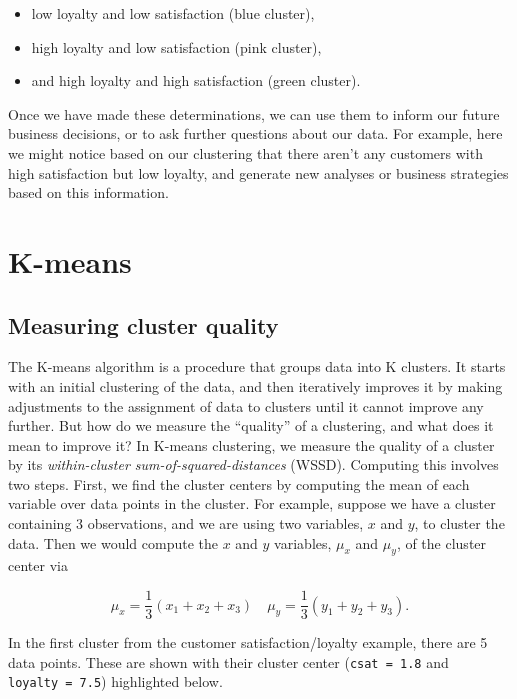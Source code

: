 \documentclass[
]{krantz}
\providecommand{\tightlist}{%
  \setlength{\itemsep}{0pt}\setlength{\parskip}{0pt}}
\begin{document}
\begin{itemize}
\tightlist
\item
  low loyalty and low satisfaction (blue cluster),
\item
  high loyalty and low satisfaction (pink cluster),
\item
  and high loyalty and high satisfaction (green cluster).
\end{itemize}

Once we have made these determinations, we can use them to inform our future business decisions,
or to ask further questions about our data. For example, here we might notice based on our clustering
that there aren't any customers with high satisfaction but low loyalty, and generate new analyses
or business strategies based on this information.

\hypertarget{k-means}{%
\section{K-means}\label{k-means}}

\hypertarget{measuring-cluster-quality}{%
\subsection{Measuring cluster quality}\label{measuring-cluster-quality}}

The K-means algorithm is a procedure that groups data into K clusters.
It starts with an initial clustering of the data, and then iteratively
improves it by making adjustments to the assignment of data
to clusters until it cannot improve any further. But how do we measure
the ``quality'' of a clustering, and what does it mean to improve it?
In K-means clustering, we measure the quality of a cluster by its
\emph{within-cluster sum-of-squared-distances} (WSSD). Computing this involves two steps.
First, we find the cluster centers by computing the mean of each variable
over data points in the cluster. For example, suppose we have a
cluster containing 3 observations, and we are using two variables, \(x\) and \(y\), to cluster the data.
Then we would compute the \(x\) and \(y\) variables, \(\mu_x\) and \(\mu_y\), of the cluster center via

\[\mu_x = \frac{1}{3}(x_1+x_2+x_3) \quad \mu_y = \frac{1}{3}(y_1+y_2+y_3).\]

In the first cluster from the customer satisfaction/loyalty example, there
are 5 data points. These are shown with their cluster center
(\texttt{csat\ =\ 1.8} and \texttt{loyalty\ =\ 7.5}) highlighted below.
\end{document}
